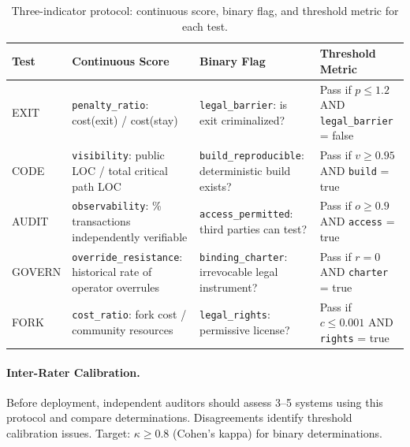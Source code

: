 \begin{table}[htbp]
\centering
\small
\caption{Three-indicator protocol: continuous score, binary flag, and threshold metric for each test.}
\label{tab:three-indicator-main}
\begin{tabular}{@{}lp{3.2cm}p{3.2cm}p{3.5cm}@{}}
\toprule
\textbf{Test} & \textbf{Continuous Score} & \textbf{Binary Flag} & \textbf{Threshold Metric} \\
\midrule
EXIT & \texttt{penalty\_ratio}: cost(exit) / cost(stay) & \texttt{legal\_barrier}: is exit criminalized? & Pass if $p \leq 1.2$ AND \texttt{legal\_barrier} = false \\
CODE & \texttt{visibility}: public LOC / total critical path LOC & \texttt{build\_reproducible}: deterministic build exists? & Pass if $v \geq 0.95$ AND \texttt{build} = true \\
AUDIT & \texttt{observability}: \% transactions independently verifiable & \texttt{access\_permitted}: third parties can test? & Pass if $o \geq 0.9$ AND \texttt{access} = true \\
GOVERN & \texttt{override\_resistance}: historical rate of operator overrules & \texttt{binding\_charter}: irrevocable legal instrument? & Pass if $r = 0$ AND \texttt{charter} = true \\
FORK & \texttt{cost\_ratio}: fork cost / community resources & \texttt{legal\_rights}: permissive license? & Pass if $c \leq 0.001$ AND \texttt{rights} = true \\
\bottomrule
\end{tabular}
\end{table}

\paragraph{Inter-Rater Calibration.} Before deployment, independent auditors should assess 3--5 systems using this protocol and compare determinations. Disagreements identify threshold calibration issues. Target: $\kappa \geq 0.8$ (Cohen's kappa) for binary determinations.

